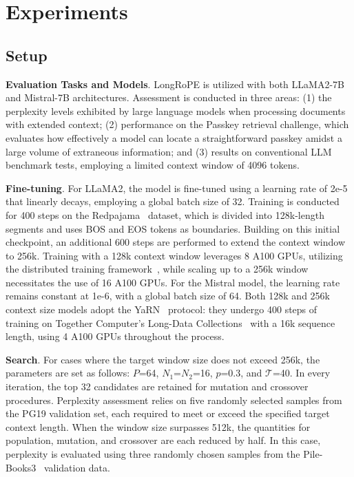  \section{Experiments}

\label{sec:exp}
\subsection{Setup}
\textbf{Evaluation Tasks and Models}. LongRoPE is utilized with both LLaMA2-7B and Mistral-7B architectures. Assessment is conducted in three areas: (1) the perplexity levels exhibited by large language models when processing documents with extended context; (2) performance on the Passkey retrieval challenge, which evaluates how effectively a model can locate a straightforward passkey amidst a large volume of extraneous information; and (3) results on conventional LLM benchmark tests, employing a limited context window of 4096 tokens.

\textbf{Fine-tuning}. For LLaMA2, the model is fine-tuned using a learning rate of 2e-5 that linearly decays, employing a global batch size of 32. Training is conducted for 400 steps on the Redpajama~\cite{redpajama} dataset, which is divided into 128k-length segments and uses BOS and EOS tokens as boundaries. Building on this initial checkpoint, an additional 600 steps are performed to extend the context window to 256k. Training with a 128k context window leverages 8 A100 GPUs, utilizing the distributed training framework~\cite{cube}, while scaling up to a 256k window necessitates the use of 16 A100 GPUs. For the Mistral model, the learning rate remains constant at 1e-6, with a global batch size of 64. Both 128k and 256k context size models adopt the YaRN~\cite{yarn} protocol: they undergo 400 steps of training on Together Computer's Long-Data Collections~\cite{mistraldata} with a 16k sequence length, using 4 A100 GPUs throughout the process.

\textbf{Search}. For cases where the target window size does not exceed 256k, the parameters are set as follows: $P$=64, $N_1$=$N_2$=16, $p$=0.3, and $\mathcal{T}$=40. In every iteration, the top 32 candidates are retained for mutation and crossover procedures. Perplexity assessment relies on five randomly selected samples from the PG19 validation set, each required to meet or exceed the specified target context length. When the window size surpasses 512k, the quantities for population, mutation, and crossover are each reduced by half. In this case, perplexity is evaluated using three randomly chosen samples from the Pile-Books3~\cite{pile} validation data.


